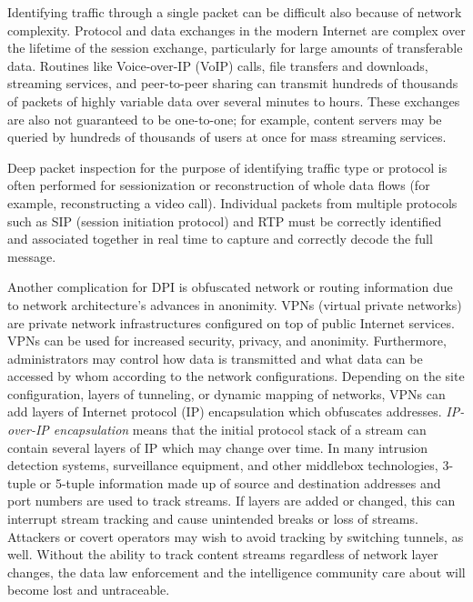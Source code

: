 Identifying traffic through a single packet can be difficult also because of network complexity. Protocol and data exchanges in the modern Internet are complex over the lifetime of the session exchange, particularly for large amounts of transferable data. Routines like Voice-over-IP (VoIP) calls, file transfers and downloads, streaming services, and peer-to-peer sharing can transmit hundreds of thousands of packets of highly variable data over several minutes to hours. These exchanges are also not guaranteed to be one-to-one; for example, content servers may be queried by hundreds of thousands of users at once for mass streaming services.

Deep packet inspection for the purpose of identifying traffic type or protocol is often performed for sessionization or reconstruction of whole data flows (for example, reconstructing a video call). Individual packets from multiple protocols such as SIP (session initiation protocol) and RTP must be correctly identified and associated together in real time to capture and correctly decode the full message.

Another complication for DPI is obfuscated network or routing information due to network architecture's advances in anonimity. VPNs (virtual private networks) are private network infrastructures configured on top of public Internet services. VPNs can be used for increased security, privacy, and anonimity. Furthermore, administrators may control how data is transmitted and what data can be accessed by whom according to the network configurations. Depending on the site configuration, layers of tunneling, or dynamic mapping of networks, VPNs can add layers of Internet protocol (IP) encapsulation which obfuscates addresses. \textit{IP-over-IP encapsulation} means that the initial protocol stack of a stream can contain several layers of IP which may change over time. In many intrusion detection systems, surveillance equipment, and other middlebox technologies, 3-tuple or 5-tuple information made up of source and destination addresses and port numbers are used to track streams. If layers are added or changed, this can interrupt stream tracking and cause unintended breaks or loss of streams. Attackers or covert operators may wish to avoid tracking by switching tunnels, as well. Without the ability to track content streams regardless of network layer changes, the data law enforcement and the intelligence community care about will become lost and untraceable.

